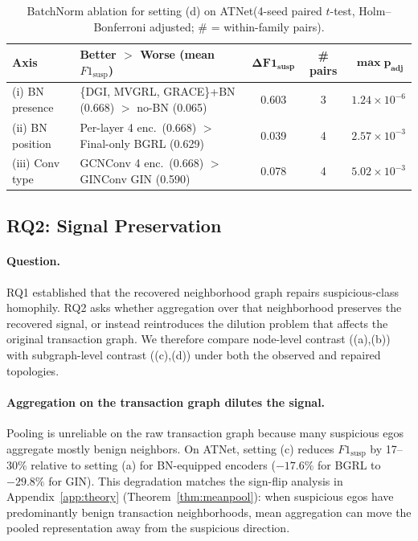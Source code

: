 \documentclass[sigconf,natbib=true,anonymous=true]{acmart}
\theoremstyle{definition}
\newcommand{\hofinet}{ATNet\xspace} %
\begin{document}
\begin{table}[t]
\centering
\caption{BatchNorm ablation for setting (d) on \hofinet (4-seed paired $t$-test, Holm–Bonferroni adjusted; \# = within-family pairs).}
\label{tab:bn_summary}
\begin{tabular}{llccc}
\toprule
\textbf{Axis} & \textbf{Better $>$ Worse (mean $F1_{\text{susp}}$)} & $\boldsymbol{\Delta F1_{\text{susp}}}$ & \textbf{\# pairs} & $\boldsymbol{\max p_{\text{adj}}}$ \\
\midrule
(i) BN presence  & \{DGI, MVGRL, GRACE\}+BN (0.668) $>$ no-BN (0.065)            & 0.603 & 3 & $1.24\times 10^{-6}$ \\
(ii) BN position & Per-layer 4 enc.\ (0.668) $>$ Final-only BGRL (0.629)          & 0.039 & 4 & $2.57\times 10^{-3}$ \\
(iii) Conv type  & GCNConv 4 enc.\ (0.668) $>$ GINConv GIN (0.590)                & 0.078 & 4 & $5.02\times 10^{-3}$ \\
\bottomrule
\end{tabular}
\end{table}

\subsection{RQ2: Signal Preservation}
\label{subsec:rq2}
\paragraph{\textbf{Question.}} RQ1 established that the recovered neighborhood graph repairs suspicious-class homophily. RQ2 asks whether aggregation over that neighborhood preserves the recovered signal, or instead reintroduces the dilution problem that affects the original transaction graph. We therefore compare node-level contrast ((a),(b)) with subgraph-level contrast ((c),(d)) under both the observed and repaired topologies.

\paragraph{\textbf{Aggregation on the transaction graph dilutes the signal.}} Pooling is unreliable on the raw transaction graph because many suspicious egos aggregate mostly benign neighbors. On \hofinet, setting (c) reduces $F1_{\text{susp}}$ by 17--30\% relative to setting (a) for BN-equipped encoders ($-17.6\%$ for BGRL to $-29.8\%$ for GIN). This degradation matches the sign-flip analysis in Appendix~\ref{app:theory} (Theorem~\ref{thm:meanpool}): when suspicious egos have predominantly benign transaction neighborhoods, mean aggregation can move the pooled representation away from the suspicious direction.
\end{document}
